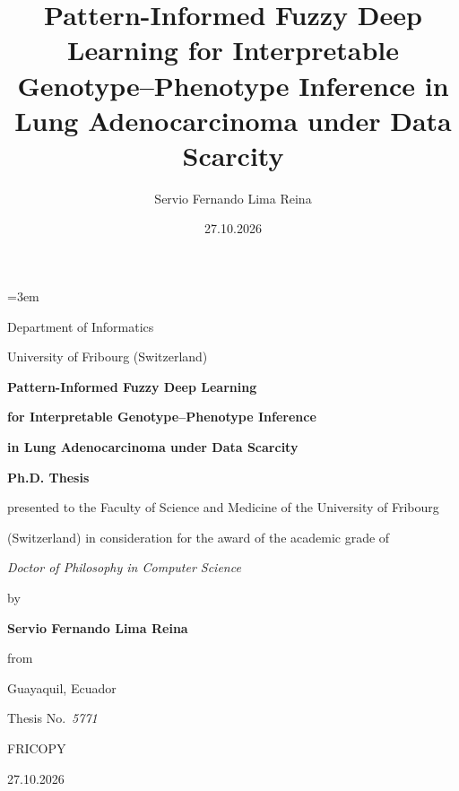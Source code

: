 \documentclass[11pt,a4paper,twoside,openany]{book}
\title{Pattern-Informed Fuzzy Deep Learning for Interpretable Genotype--Phenotype Inference in Lung Adenocarcinoma under Data Scarcity}
\author{Servio Fernando Lima Reina}
\date{27.10.2026}
\begin{document}
\emergencystretch=3em
\let\cleardoublepage\clearpage
\pagestyle{empty}
\frontmatter
\setcounter{page}{1}

\begin{titlepage}
  \centering
  \vspace*{0.05\textheight}

  {\large Department of Informatics\par}
  {\large University of Fribourg (Switzerland)\par}

  \vspace{0.10\textheight}

  {\LARGE\bfseries Pattern-Informed Fuzzy Deep Learning\par}
  \vspace{0.4em}
  {\Large\bfseries for Interpretable Genotype--Phenotype Inference\par}
  \vspace{0.4em}
  {\Large\bfseries in Lung Adenocarcinoma under Data Scarcity\par}

  \vspace{0.07\textheight}

  {\Large\bfseries Ph.D. Thesis\par}
  \vspace{0.6em}
  {\normalsize presented to the Faculty of Science and Medicine of the University of Fribourg\par}
  {\normalsize (Switzerland) in consideration for the award of the academic grade of\par}
  \vspace{0.3em}
  {\normalsize\itshape Doctor of Philosophy in Computer Science\par}

  \vspace{0.07\textheight}

  {\normalsize by\par}
  \vspace{0.4em}
  {\LARGE\bfseries Servio Fernando Lima Reina\par}
  \vspace{0.4em}
  {\normalsize from\par}
  \vspace{0.3em}
  {\large Guayaquil, Ecuador\par}

  \vfill

  {\normalsize Thesis No.\ \emph{5771}\par}
  {\normalsize FRICOPY\par}
  {\normalsize 27.10.2026\par}

  \vspace*{0.03\textheight}
\end{titlepage}
\end{document}
